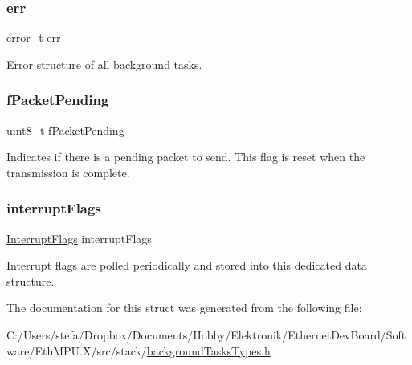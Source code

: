 \subsubsection{\texorpdfstring{err}{err}}
{\footnotesize\ttfamily \mbox{\hyperlink{group__error_gad3ae44be85fe6952dcaed425499e8f6b}{error\+\_\+t}} err}



Error structure of all background tasks. 

\mbox{\label{structbackground_task_handler___a55a5ad03a1e3f5808b419c49021b4759}} 
\subsubsection{\texorpdfstring{fPacketPending}{fPacketPending}}
{\footnotesize\ttfamily uint8\+\_\+t f\+Packet\+Pending}



Indicates if there is a pending packet to send. This flag is reset when the transmission is complete. 

\mbox{\label{structbackground_task_handler___a52d2441cebb4150e2a4048da6eec1049}} 
\subsubsection{\texorpdfstring{interruptFlags}{interruptFlags}}
{\footnotesize\ttfamily \mbox{\hyperlink{group__interrupts_gab9c62f51454f2263c8f306c48ffc323b}{Interrupt\+Flags}} interrupt\+Flags}



Interrupt flags are polled periodically and stored into this dedicated data structure. 



The documentation for this struct was generated from the following file\+:\begin{DoxyCompactItemize}
\item 
C\+:/\+Users/stefa/\+Dropbox/\+Documents/\+Hobby/\+Elektronik/\+Ethernet\+Dev\+Board/\+Software/\+Eth\+M\+P\+U.\+X/src/stack/\mbox{\hyperlink{background_tasks_types_8h}{background\+Tasks\+Types.\+h}}\end{DoxyCompactItemize}
